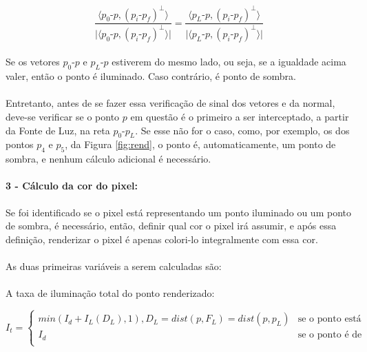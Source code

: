 \documentclass{article}
\begin{document}
	$$\frac{\langle p_0\text{-}p , (p_i\text{-}p_f)^\bot \rangle}{\lvert \langle p_0\text{-}p , (p_i\text{-}p_f)^\bot \rangle \rvert} = \frac{\langle p_L\text{-}p , (p_i\text{-}p_f)^\bot \rangle}{\lvert \langle p_L\text{-}p , (p_i\text{-}p_f)^\bot \rangle \rvert}$$
	
	\paragraph{}
	Se os vetores $p_0\text{-}p$ e $p_L\text{-}p$ estiverem do mesmo lado, ou seja, se a igualdade acima valer, então o ponto é iluminado. Caso contrário, é ponto de sombra.
	
	\paragraph{}
	Entretanto, antes de se fazer essa verificação de sinal dos vetores e da normal, deve-se verificar se o ponto $p$ em questão é o primeiro a ser interceptado, a partir da Fonte de Luz, na reta $p_0$-$p_L$. Se esse não for o caso, como, por exemplo, os dos pontos $p_4$ e $p_5$, da Figura \ref{fig:rend}, o ponto é, automaticamente, um ponto de sombra, e nenhum cálculo adicional é necessário.
	
	\paragraph{3 - Cálculo da cor do pixel: }
	Se foi identificado se o pixel está representando um ponto iluminado ou um ponto de sombra, é necessário, então, definir qual cor o pixel irá assumir, e após essa definição, renderizar o pixel é apenas colori-lo integralmente com essa cor.
	
	\paragraph{}
	As duas primeiras variáveis a serem calculadas são:
	
	\paragraph{}
	A taxa de iluminação total do ponto renderizado: 

	\begin{equation} \label{eq:2}
		I_t =  \begin{cases} 
			min(I_d + I_L(D_L), 1), D_L = dist(p, F_L) = dist(p, p_L) & \text{se o ponto está iluminado} \\
			I_d & \text{se o ponto é de sombra} \\
		\end{cases} 
	\end{equation}
\end{document}
